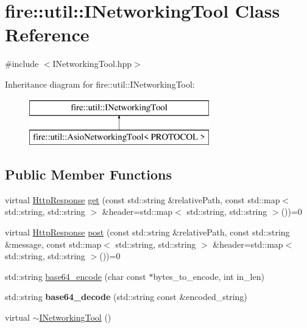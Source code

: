\hypertarget{a01609}{}\section{fire\+:\+:util\+:\+:I\+Networking\+Tool Class Reference}
\label{a01609}


{\ttfamily \#include $<$I\+Networking\+Tool.\+hpp$>$}

Inheritance diagram for fire\+:\+:util\+:\+:I\+Networking\+Tool\+:\begin{figure}[H]
\begin{center}
\leavevmode
\includegraphics[height=2.000000cm]{a01609}
\end{center}
\end{figure}
\subsection*{Public Member Functions}
\begin{DoxyCompactItemize}
\item 
virtual \hyperlink{a01605}{Http\+Response} \hyperlink{a01609_a44b81ebf8421f0e32ed99b5e372ef007}{get} (const std\+::string \&relative\+Path, const std\+::map$<$ std\+::string, std\+::string $>$ \&header=std\+::map$<$ std\+::string, std\+::string $>$())=0
\item 
virtual \hyperlink{a01605}{Http\+Response} \hyperlink{a01609_ad6ff0e352d78f17a6f6184d1b80e0c94}{post} (const std\+::string \&relative\+Path, const std\+::string \&message, const std\+::map$<$ std\+::string, std\+::string $>$ \&header=std\+::map$<$ std\+::string, std\+::string $>$())=0
\item 
std\+::string \hyperlink{a01609_ab93be61530f01e64cb3c688976a6887b}{base64\+\_\+encode} (char const $\ast$bytes\+\_\+to\+\_\+encode, int in\+\_\+len)
\item 
\mbox{\label{a01609_ae050106ca2338332893606cea2f3881a}} 
std\+::string {\bfseries base64\+\_\+decode} (std\+::string const \&encoded\+\_\+string)
\item 
virtual \hyperlink{a01609_a2beca71d6ecb1688809f0e5e0548c17c}{$\sim$\+I\+Networking\+Tool} ()
\end{DoxyCompactItemize}

